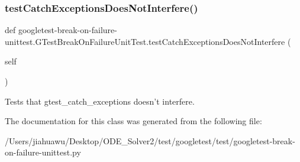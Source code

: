\subsubsection{\texorpdfstring{test\+Catch\+Exceptions\+Does\+Not\+Interfere()}{testCatchExceptionsDoesNotInterfere()}}
{\footnotesize\ttfamily def googletest-\/break-\/on-\/failure-\/unittest.\+G\+Test\+Break\+On\+Failure\+Unit\+Test.\+test\+Catch\+Exceptions\+Does\+Not\+Interfere (\begin{DoxyParamCaption}\item[{}]{self }\end{DoxyParamCaption})}

\begin{DoxyVerb}Tests that gtest_catch_exceptions doesn't interfere.\end{DoxyVerb}
 

The documentation for this class was generated from the following file\+:\begin{DoxyCompactItemize}
\item 
/\+Users/jiahuawu/\+Desktop/\+O\+D\+E\+\_\+\+Solver2/test/googletest/test/googletest-\/break-\/on-\/failure-\/unittest.\+py\end{DoxyCompactItemize}
